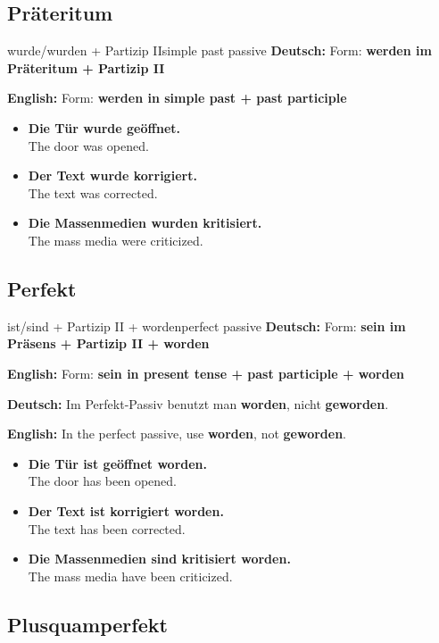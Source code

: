 \documentclass[a4paper,11pt]{article}
\newcommand{\GermanText}[1]{\textbf{Deutsch: }#1\par}
\newcommand{\EnglishText}[1]{{\small\color{SoftGray}\textbf{English: }#1\par}}
\newcommand{\ExampleItem}[2]{\item \textbf{#1}\\{\small\color{SoftGray}#2}}
\begin{document}
\subsection{Präteritum}

\begin{grammarentry}{wurde/wurden + Partizip II}{simple past passive}
\GermanText{Form: \textbf{werden im Präteritum + Partizip II}}
\EnglishText{Form: \textbf{werden in simple past + past participle}}

\begin{exbox}
\begin{itemize}
    \ExampleItem{Die Tür wurde geöffnet.}{The door was opened.}
    \ExampleItem{Der Text wurde korrigiert.}{The text was corrected.}
    \ExampleItem{Die Massenmedien wurden kritisiert.}{The mass media were criticized.}
\end{itemize}
\end{exbox}
\end{grammarentry}

\subsection{Perfekt}

\begin{grammarentry}{ist/sind + Partizip II + worden}{perfect passive}
\GermanText{Form: \textbf{sein im Präsens + Partizip II + worden}}
\EnglishText{Form: \textbf{sein in present tense + past participle + worden}}

\GermanText{Im Perfekt-Passiv benutzt man \textbf{worden}, nicht \textbf{geworden}.}
\EnglishText{In the perfect passive, use \textbf{worden}, not \textbf{geworden}.}

\begin{exbox}
\begin{itemize}
    \ExampleItem{Die Tür ist geöffnet worden.}{The door has been opened.}
    \ExampleItem{Der Text ist korrigiert worden.}{The text has been corrected.}
    \ExampleItem{Die Massenmedien sind kritisiert worden.}{The mass media have been criticized.}
\end{itemize}
\end{exbox}
\end{grammarentry}

\subsection{Plusquamperfekt}
\end{document}
